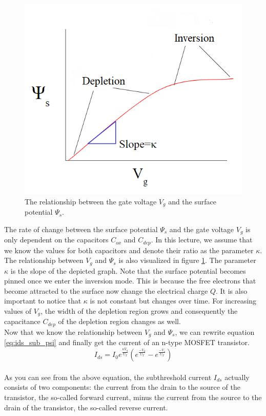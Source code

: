 \begin{figure}
    \centering
    \includegraphics[width=.6\linewidth]{Figures/Vg_vs_Psis.PNG}
    \caption{The relationship between the gate voltage $V_g$ and the surface potential $\Psi_s$.}
    \label{fig:vg_psis}
\end{figure}

The rate of change between the surface potential $\Psi_s$ and the gate voltage $V_g$ is only dependent on the capacitors $C_{ox}$ and $C_{dep}$. In this lecture, we assume that we know the values for both capacitors and denote their ratio as the parameter $\kappa$. The relationship between $V_g$ and $\Psi_s$ is also visualized in figure \ref{fig:vg_psis}. The parameter $\kappa$ is the slope of the depicted graph. Note that the surface potential becomes pinned once we enter the inversion mode. This is because the free electrons that become attracted to the surface now change the electrical charge $Q$. It is also important to notice that $\kappa$ is not constant but changes over time. For increasing values of $V_g$, the width of the depletion region grows and consequently the capacitance $C_{dep}$ of the depletion region changes as well.\\

Now that we know the relationship between $V_g$ and $\Psi_s$, we can rewrite equation \ref{eq:ids_sub_psi} and finally get the current of an n-type MOSFET transistor.\\

\begin{equation}
    I_{ds} = I_0 e^{\frac{\kappa V_g}{U_T}}(e^{\frac{-V_d}{U_T}} - e^{\frac{-V_s}{U_T}})
\end{equation}\\

As you can see from the above equation, the subthreshold current $I_{ds}$ actually consists of two components: the current from the drain to the source of the transistor, the so-called forward current, minus the current from the source to the drain of the transistor, the so-called reverse current.\\

